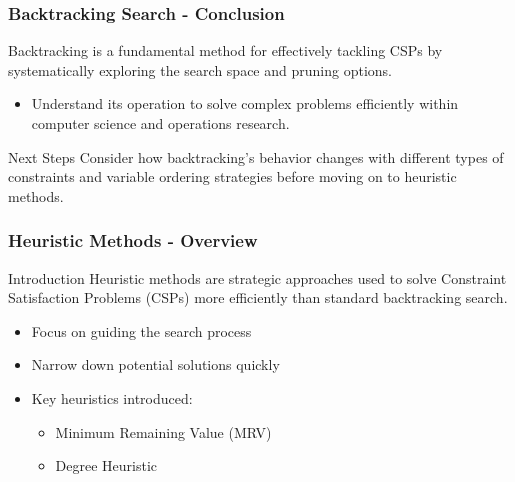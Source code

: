 \documentclass[aspectratio=169]{beamer}
\begin{document}
\begin{frame}[fragile]
    \frametitle{Backtracking Search - Conclusion}
    Backtracking is a fundamental method for effectively tackling CSPs by systematically exploring the search space and pruning options.

    \begin{itemize}
        \item Understand its operation to solve complex problems efficiently within computer science and operations research.
    \end{itemize}
    
    \begin{block}{Next Steps}
        Consider how backtracking's behavior changes with different types of constraints and variable ordering strategies before moving on to heuristic methods.
    \end{block}
\end{frame}

\begin{frame}[fragile]
    \frametitle{Heuristic Methods - Overview}
    \begin{block}{Introduction}
        Heuristic methods are strategic approaches used to solve Constraint Satisfaction Problems (CSPs) more efficiently than standard backtracking search.
    \end{block}
    
    \begin{itemize}
        \item Focus on guiding the search process
        \item Narrow down potential solutions quickly
        \item Key heuristics introduced:
        \begin{itemize}
            \item Minimum Remaining Value (MRV)
            \item Degree Heuristic
        \end{itemize}
    \end{itemize}
\end{frame}
\end{document}
